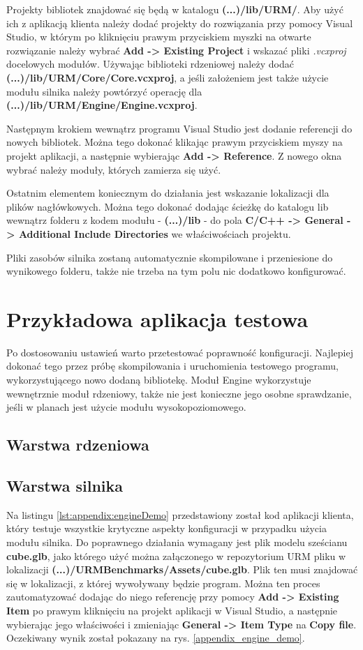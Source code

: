 Projekty bibliotek znajdować się będą w katalogu \textbf{(...)/lib/URM/}. Aby użyć ich z aplikacją klienta należy dodać projekty do rozwiązania przy pomocy Visual Studio, w którym po kliknięciu prawym przyciskiem myszki na otwarte rozwiązanie należy wybrać \textbf{Add -> Existing Project} i wskazać pliki \textit{.vcxproj} docelowych modułów. Używając biblioteki rdzeniowej należy dodać \textbf{(...)/lib/URM/Core/Core.vcxproj}, a jeśli założeniem jest także użycie modułu silnika należy powtórzyć operację dla \textbf{(...)/lib/URM/Engine/Engine.vcxproj}.

Następnym krokiem wewnątrz programu Visual Studio jest dodanie referencji do nowych bibliotek. Można tego dokonać klikając prawym przyciskiem myszy na projekt aplikacji, a następnie wybierając \textbf{Add -> Reference}. Z nowego okna wybrać należy moduły, których zamierza się użyć.

Ostatnim elementem koniecznym do działania jest wskazanie lokalizacji dla plików nagłówkowych. Można tego dokonać dodając ścieżkę do katalogu lib wewnątrz folderu z kodem modułu - \textbf{(...)/lib} - do pola \textbf{C/C++ -> General -> Additional Include Directories} we właściwościach projektu.

Pliki zasobów silnika zostaną automatycznie skompilowane i przeniesione do wynikowego folderu, także nie trzeba na tym polu nic dodatkowo konfigurować. 

\section*{Przykładowa aplikacja testowa}
Po dostosowaniu ustawień warto przetestować poprawność konfiguracji. Najlepiej dokonać tego przez próbę skompilowania i uruchomienia testowego programu, wykorzystującego nowo dodaną bibliotekę. Moduł Engine wykorzystuje wewnętrznie moduł rdzeniowy, także nie jest konieczne jego osobne sprawdzanie, jeśli w planach jest użycie modułu wysokopoziomowego. 

\subsection*{Warstwa rdzeniowa}

\subsection*{Warstwa silnika}
Na listingu \ref{lst:appendix:engineDemo} przedstawiony został kod aplikacji klienta, który testuje wszystkie krytyczne aspekty konfiguracji w przypadku użycia modułu silnika. Do poprawnego działania wymagany jest plik modelu sześcianu \textbf{cube.glb}, jako którego użyć można załączonego w repozytorium URM \cite{GitHub:Minik:MasterThesisUniversalRenderingModuleD3D11} pliku w lokalizacji \textbf{(...)/URMBenchmarks/Assets/cube.glb}. Plik ten musi znajdować się w lokalizacji, z której wywoływany będzie program. Można ten proces zautomatyzować dodając do niego referencję przy pomocy \textbf{Add -> Existing Item} po prawym kliknięciu na projekt aplikacji w Visual Studio, a następnie wybierając jego właściwości i zmieniając \textbf{General -> Item Type} na \textbf{Copy file}. Oczekiwany wynik został pokazany na rys. \ref{appendix_engine_demo}.

